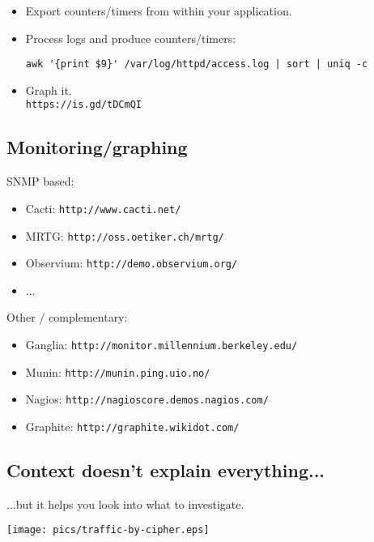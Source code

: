 \documentclass[xga]{xdvislides}
\begin{document}
\addvspace{.5in}
\begin{itemize}
	\item Export counters/timers from within your application.
	\item Process logs and produce counters/timers:
\begin{verbatim}
awk '{print $9}' /var/log/httpd/access.log | sort | uniq -c
\end{verbatim}
\end{itemize}

\addvspace{.5in}
\begin{itemize}
	\item Graph it. \\
	{\tt https://is.gd/tDCmQI}
\end{itemize}

\subsection{Monitoring/graphing}
SNMP based:
\begin{itemize}
	\item Cacti: \verb+http://www.cacti.net/+
	\item MRTG: \verb+http://oss.oetiker.ch/mrtg/+
	\item Observium: \verb+http://demo.observium.org/+
	\item ...
\end{itemize}
\vspace{.2in}
Other / complementary:
\begin{itemize}
	\item Ganglia: \verb+http://monitor.millennium.berkeley.edu/+
	\item Munin: \verb+http://munin.ping.uio.no/+
	\item Nagios: \verb+http://nagioscore.demos.nagios.com/+
	\item Graphite: \verb+http://graphite.wikidot.com/+
\end{itemize}
\vspace{.5in}

\subsection{Context doesn't explain everything...}
...but it helps you look into what to investigate.

\begin{center}
	\texttt{[image: pics/traffic-by-cipher.eps]}
\end{center}
\end{document}
